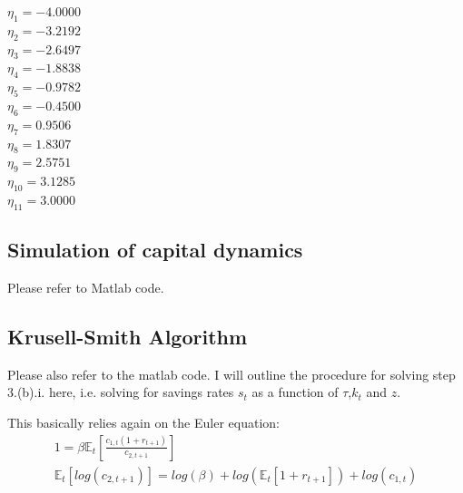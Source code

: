 \documentclass[12pt,a4paper]{article}
\begin{document}
$\eta_1 = -4.0000  $ \\
$\eta_2 = -3.2192 $ \\
$\eta_3 = -2.6497 $ \\
$\eta_4 = -1.8838 $ \\
$\eta_5 = -0.9782 $ \\
$\eta_6 = -0.4500 $ \\
$\eta_7 = 0.9506 $ \\
$\eta_8 = 1.8307 $ \\
$\eta_9 = 2.5751 $ \\
$\eta_{10} = 3.1285 $ \\
$\eta_{11} = 3.0000 $ \\

\subsection{Simulation of capital dynamics}
Please refer to Matlab code.

\subsection{Krusell-Smith Algorithm}
Please also refer to the matlab code. I will outline the procedure for solving step 3.(b).i. here, i.e. solving for savings rates $s_t$ as a function of $\tau$,$k_t$ and $z$.

This basically relies again on the Euler equation:
\begin{align*}
          1 = \beta \mathbb{E}_t \left[ \frac{c_{1,t} (1+r_{t+1})}{c_{2,t+1}} \right]\\
          \mathbb{E}_t\left[log\left(c_{2,t+1}\right)\right] = log\left(\beta\right) + log\left( \mathbb{E}_t \left[1+r_{t+1}\right]\right)  + log\left( c_{1,t} \right)
\end{align*}
\end{document}
